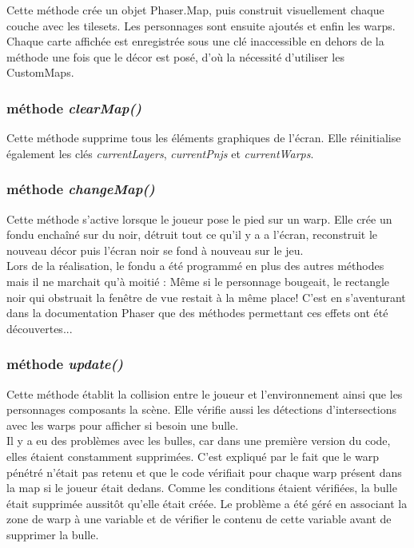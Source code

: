 \documentclass[11pt]{article}
\begin{document}
\begin{appendices}
Cette méthode crée un objet Phaser.Map, puis construit visuellement chaque couche avec les tilesets. Les personnages sont ensuite ajoutés et enfin les warps. Chaque carte affichée est enregistrée sous une clé inaccessible en dehors de la méthode une fois que le décor est posé, d'où la nécessité d'utiliser les CustomMaps.
\subsubsection{méthode \textit{clearMap()}}
Cette méthode supprime tous les éléments graphiques de l'écran. Elle réinitialise également les clés \textit{currentLayers}, \textit{currentPnjs} et \textit{currentWarps}.
\subsubsection{méthode \textit{changeMap()}}
Cette méthode s'active lorsque le joueur pose le pied sur un warp. 
Elle crée un fondu enchaîné sur du noir, détruit tout ce qu'il y a a l'écran, reconstruit le nouveau décor puis l'écran noir se fond à nouveau sur le jeu.\\

Lors de la réalisation, le fondu a été programmé en plus des autres méthodes mais il ne marchait qu'à moitié : Même si le personnage bougeait, le rectangle noir qui obstruait la fenêtre de vue restait à la même place! C'est en s'aventurant dans la documentation Phaser que des méthodes permettant ces effets ont été découvertes...
\subsubsection{méthode \textit{update()}}
Cette méthode établit la collision entre le joueur et l'environnement ainsi que les personnages composants la scène. Elle vérifie aussi les détections d'intersections avec les warps pour afficher si besoin une bulle.\\

Il y a eu des problèmes avec les bulles, car dans une première version du code, elles étaient constamment supprimées. C'est expliqué par le fait que le warp pénétré n'était pas retenu et que le code vérifiait pour chaque warp présent dans la map si le joueur était dedans. Comme les conditions étaient vérifiées, la bulle était supprimée aussitôt qu'elle était créée. Le problème a été géré en associant la zone de warp à une variable et de vérifier le contenu de cette variable avant de supprimer la bulle.

\end{appendices}
\end{document}
